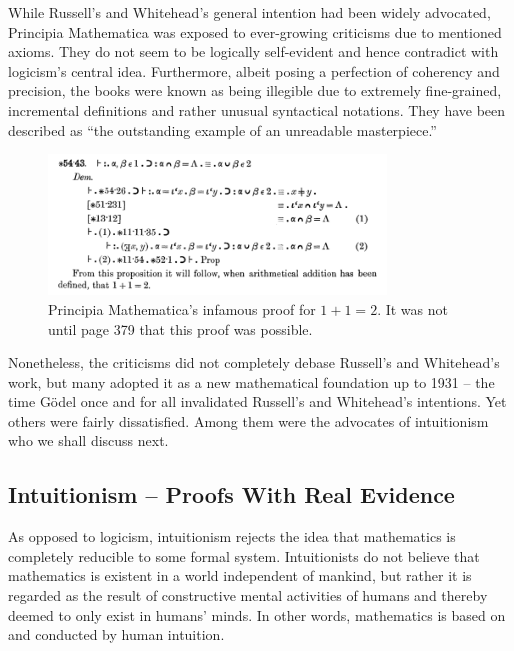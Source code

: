 \documentclass{article}
\begin{document}
While Russell's and Whitehead's general intention had been widely advocated, Principia Mathematica was exposed to ever-growing criticisms due to mentioned axioms. They do not seem to be logically self-evident and hence contradict with logicism's central idea. Furthermore, albeit posing a perfection of coherency and precision, the books were known as being illegible due to extremely fine-grained, incremental definitions and rather unusual syntactical notations. They have been described as ``the outstanding example of an unreadable masterpiece.''\cite[p.~154]{math_experience}

\begin{figure}[h]
	\centering
	\includegraphics[width=0.8\textwidth]{img/principia_mathematica.png}
	\caption{Principia Mathematica's infamous proof for $1+1=2$. It was not until page 379 that this proof was possible.}
\end{figure}
Nonetheless, the criticisms did not completely debase Russell's and Whitehead's work, but many adopted it as a new mathematical foundation up to 1931 -- the time Gödel once and for all invalidated Russell's and Whitehead's intentions. Yet others were fairly dissatisfied. Among them were the advocates of intuitionism who we shall discuss next.

\subsection{Intuitionism -- Proofs With Real Evidence}\label{ssec_intuitionism}
As opposed to logicism, intuitionism rejects the idea that mathematics is completely reducible to some formal system. Intuitionists do not believe that mathematics is existent in a world independent of mankind, but rather it is regarded as the result of constructive mental activities of humans and thereby deemed to only exist in humans' minds. In other words, mathematics is based on and conducted by human intuition.
\end{document}

